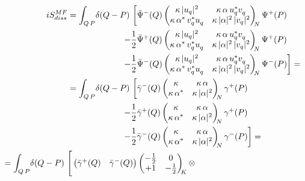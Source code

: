 \documentclass[a4paper,11pt, english]{article}
\theoremstyle{remark}
\begin{document}
\begin{subequations} \label{eq:mHS_QuadraticModelKeldyshAction} \begin{align} 
iS_{diss}^{MF} =\int_{Q\,P}\!\delta(Q-P)\ \bigg[&
	        \bar{\Psi}^-(Q) \begin{pmatrix}\kappa\,|u_q|^2 & \kappa\,\alpha\,u_q^*v_q^{ }  \\ \kappa\,\alpha^*\,v_q^*u_q^{ } & \kappa\,|\alpha|^2\,|v_q|^2 \end{pmatrix}_{\!\!N} \Psi^+_{ }(P) \notag \\
   \ -\frac{1}{2} &\bar{\Psi}^+(Q) \begin{pmatrix}\kappa\,|u_q|^2 & \kappa\,\alpha\,u_q^*v_q^{ }  \\ \kappa\,\alpha^*\,v_q^*u_q^{ } & \kappa\,|\alpha|^2\,|v_q|^2 \end{pmatrix}_{\!\!N} \Psi^+_{ }(P)\\
   \ -\frac{1}{2} &\bar{\Psi}^{ -}_{ }(Q) \begin{pmatrix}\kappa\,|u_q|^2 & \kappa\,\alpha\,u_q^*v_q^{ }  \\ \kappa\,\alpha^*\,v_q^*u_q^{ } & \kappa\,|\alpha|^2\,|v_q|^2 \end{pmatrix}_{\!\!N} \Psi^-_{ }(P)\bigg] = \notag \\
		=\int_{Q\,P}\!\delta(Q-P)\ \bigg[&
	        \bar{\gamma}^-(Q) \begin{pmatrix}\kappa & \kappa\,\alpha \\ \kappa\,\alpha^* & \kappa\,|\alpha|^2 \end{pmatrix}_{\!\!N} \gamma^+_{ }(P) \notag \\
   \ -\frac{1}{2} &\bar{\gamma}^+(Q) \begin{pmatrix}\kappa & \kappa\,\alpha \\ \kappa\,\alpha^* & \kappa\,|\alpha|^2 \end{pmatrix}_{\!\!N} \gamma^+_{ }(P)\\
   \ -\frac{1}{2} &\bar{\gamma}^{ -}_{ }(Q) \begin{pmatrix}\kappa & \kappa\,\alpha \\ \kappa\,\alpha^* & \kappa\,|\alpha|^2 \end{pmatrix}_{\!\!N} \gamma^-_{ }(P)\bigg] = \notag\\
	       =\int_{Q\,P}\!\delta(Q-P)\ \Bigg[\begin{pmatrix} \bar{\gamma}^+(Q)&\bar{\gamma}^-(Q)\end{pmatrix} &
	       \begin{pmatrix}-\frac{1}{2} & 0 \\ +1 & -\frac{1}{2}\end{pmatrix}_{\!\!K}\otimes

\end{align}
\end{subequations}
\end{document}
